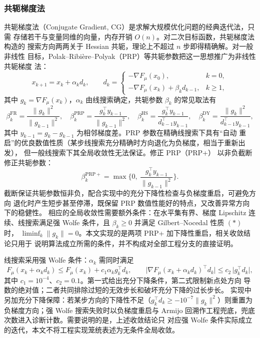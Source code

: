 \documentclass[withoutpreface,bwprint]{cumcmthesis}
\begin{document}
\subsubsection{共轭梯度法}

共轭梯度法（Conjugate Gradient, CG）是求解大规模优化问题的经典迭代法，只需
存储若干与变量同维的向量，内存开销 $O(n)$。对二次目标函数，共轭梯度法构造的
搜索方向两两关于 Hessian 共轭，理论上不超过 $n$ 步即得精确解。对一般非线性
目标，Polak--Ribière--Polyak（PRP）等共轭参数把这一思想推广为非线性共轭梯度
法：
\begin{equation}
  x_{k+1}=x_k+\alpha_kd_k,\qquad
  d_k=
  \begin{cases}
    -\nabla F_{\mu}(x_0), & k=0,\\
    -\nabla F_{\mu}(x_k)+\beta_k d_{k-1}, & k\ge1,
  \end{cases}
  \label{eq:cgdir}
\end{equation}
其中 $g_k=\nabla F_{\mu}(x_k)$，$\alpha_k$ 由线搜索确定，共轭参数 $\beta_k$
的常见取法有
\begin{equation}
  \beta_k^{\mathrm{FR}}=\frac{\|g_k\|^{2}}{\|g_{k-1}\|^{2}},\quad
  \beta_k^{\mathrm{PRP}}=\frac{g_k^{\top}y_{k-1}}{\|g_{k-1}\|^{2}},\quad
  \beta_k^{\mathrm{HS}}=\frac{g_k^{\top}y_{k-1}}{d_{k-1}^{\top}y_{k-1}},\quad
  \beta_k^{\mathrm{DY}}=\frac{\|g_k\|^{2}}{d_{k-1}^{\top}y_{k-1}},
\end{equation}
其中 $y_{k-1}=g_k-g_{k-1}$ 为相邻梯度差。PRP 参数在精确线搜索下具有``自动
重启''的优良数值性质（某步线搜索充分精确时方向退化为负梯度，相当于重新出发），
但一般线搜索下其全局收敛性无法保证。修正 PRP（PRP+）
以非负截断修正共轭参数：
\begin{equation}
  \beta_k^{\mathrm{PRP}+}=\max\Big\{0,\ \frac{g_k^{\top}y_{k-1}}{\|g_{k-1}\|^{2}}\Big\}.
  \label{eq:prpp}
\end{equation}
截断保证共轭参数恒非负，配合实现中的充分下降性检查与负梯度重启，可避免方向
退化时产生短步甚至停滞，既保留 PRP 数值性能好的特点，又改善异常方向下的稳健性。
相应的全局收敛性需要额外条件：在水平集有界、梯度 Lipschitz 连续、线搜索满足强
Wolfe 条件，且 $\beta_k\ge0$ 并满足 Gilbert--Nocedal 性质 $(*)$ 时，
$\liminf_k\|g_k\|=0$。本文实现的是两项 PRP+ 加下降性重启，相关收敛结论只用于
说明算法成立所需的条件，并不构成对全部工程分支的直接证明。

线搜索采用强 Wolfe 条件：$\alpha_k$ 需同时满足
\begin{equation}
  F_{\mu}(x_k+\alpha_kd_k)\le F_{\mu}(x_k)+c_1\alpha_k g_k^{\top}d_k,
  \qquad
  \big|\nabla F_{\mu}(x_k+\alpha_kd_k)^{\top}d_k\big|\le
  c_2\,\big|g_k^{\top}d_k\big|,
\end{equation}
其中 $c_1=10^{-4}$、$c_2=0.1$。第一式给出充分下降条件，第二式限制新点处方向
导数的绝对值；二者共同排除过短的无效步长和破坏充分下降的过长步长。
实现中另加充分下降保障：若某步方向的下降性不足（$g_k^{\top}d_k\ge
-10^{-7}\|g_k\|^2$）则重置为负梯度方向；强 Wolfe 搜索失败时以负梯度重启与
Armijo 回溯作工程兜底，兜底次数进入诊断计数。需要说明的是，上述收敛结论只
对应强 Wolfe 条件实际成立的迭代，本文不将工程实现笼统表述为无条件全局收敛。
\end{document}
